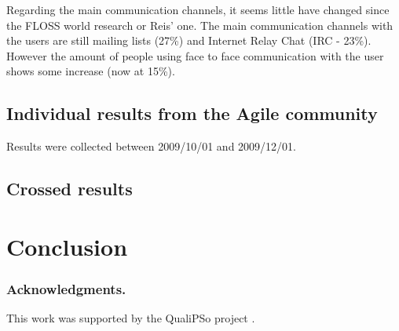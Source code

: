 \documentclass[lnbip]{svmultln}
\begin{document}
Regarding the main communication channels, it seems little have
changed since the FLOSS world research or Reis' one. The main
communication channels with the users are still mailing lists (27\%)
and Internet Relay Chat (IRC - 23\%). However the amount of people
using face to face communication with the user shows some increase
(now at 15\%).

\subsection{Individual results from the Agile community}
\label{subsec:agile-results}

Results were collected between 2009/10/01 and 2009/12/01.

\subsection{Crossed results}
\label{subsec:crossed-results}

\section{Conclusion}
\label{sec:conclusion}


\subsubsection*{Acknowledgments.}

This work was supported by the QualiPSo project \cite{url:qualipso}.
\end{document}
